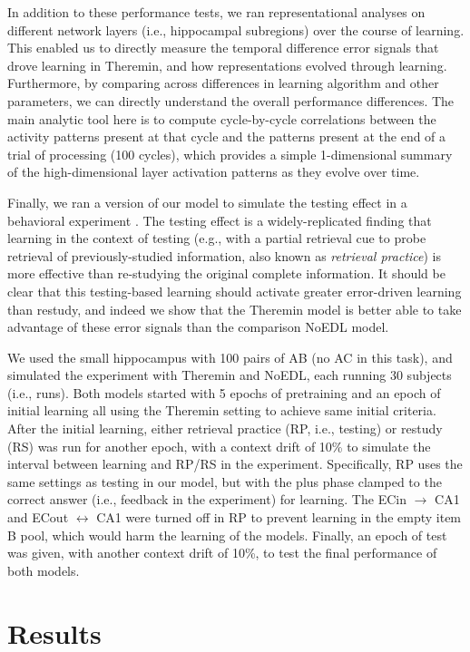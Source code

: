 \documentclass[10pt,letterpaper]{article}
\begin{document}
In addition to these performance tests, we ran representational analyses on different network layers (i.e., hippocampal subregions) over the course of learning.  This enabled us to directly measure the temporal difference error signals that drove learning in Theremin, and how representations evolved through learning.  Furthermore, by comparing across differences in learning algorithm and other parameters, we can directly understand the overall performance differences.  The main analytic tool here is to compute cycle-by-cycle correlations between the activity patterns present at that cycle and the patterns present at the end of a trial of processing (100 cycles), which provides a simple 1-dimensional summary of the high-dimensional layer activation patterns as they evolve over time.

Finally, we ran a version of our model to simulate the testing effect in a behavioral experiment \cite{CarrierPashler92}.  The testing effect is a widely-replicated finding that learning in the context of testing (e.g., with a partial retrieval cue to probe retrieval of previously-studied information, also known as \emph{retrieval practice}) is more effective than re-studying the original complete information.  It should be clear that this testing-based learning should activate greater error-driven learning than restudy, and indeed we show that the Theremin model is better able to take advantage of these error signals than the comparison NoEDL model.

We used the small hippocampus with 100 pairs of AB (no AC in this task), and simulated the experiment with Theremin and NoEDL, each running 30 subjects (i.e., runs).  Both models started with 5 epochs of pretraining and an epoch of initial learning all using the Theremin setting to achieve same initial criteria.  After the initial learning, either retrieval practice (RP, i.e., testing) or restudy (RS) was run for another epoch, with a context drift of 10\% to simulate the interval between learning and RP/RS in the experiment. Specifically, RP uses the same settings as testing in our model, but with the plus phase clamped to the correct answer (i.e., feedback in the experiment) for learning.  The ECin $\rightarrow$ CA1 and ECout $\leftrightarrow$ CA1 were turned off in RP to prevent learning in the empty item B pool, which would harm the learning of the models.  Finally, an epoch of test was given, with another context drift of 10\%, to test the final performance of both models. 


\section*{Results}
\end{document}

